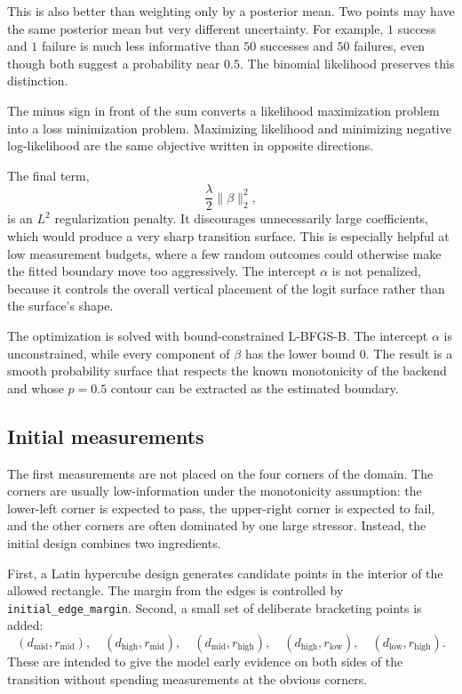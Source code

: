 This is also better than weighting only by a posterior mean.  Two points may
have the same posterior mean but very different uncertainty.  For example,
\(1\) success and \(1\) failure is much less informative than \(50\) successes
and \(50\) failures, even though both suggest a probability near \(0.5\).  The
binomial likelihood preserves this distinction.

The minus sign in front of the sum converts a likelihood maximization problem
into a loss minimization problem.  Maximizing likelihood and minimizing negative
log-likelihood are the same objective written in opposite directions.

The final term,
\[
    \frac{\lambda}{2}\|\beta\|_2^2,
\]
is an \(L^2\) regularization penalty.  It discourages unnecessarily large
coefficients, which would produce a very sharp transition surface.  This is
especially helpful at low measurement budgets, where a few random outcomes
could otherwise make the fitted boundary move too aggressively.  The intercept
\(\alpha\) is not penalized, because it controls the overall vertical placement
of the logit surface rather than the surface's shape.

The optimization is solved with bound-constrained L-BFGS-B.  The intercept
\(\alpha\) is unconstrained, while every component of \(\beta\) has the lower
bound \(0\).  The result is a smooth probability surface that respects the known
monotonicity of the backend and whose \(p=0.5\) contour can be extracted as the
estimated boundary.

\subsection{Initial measurements}

The first measurements are not placed on the four corners of the domain.  The
corners are usually low-information under the monotonicity assumption: the
lower-left corner is expected to pass, the upper-right corner is expected to
fail, and the other corners are often dominated by one large stressor.  Instead,
the initial design combines two ingredients.

First, a Latin hypercube design generates candidate points in the interior of
the allowed rectangle.  The margin from the edges is controlled by
\texttt{initial\_edge\_margin}.  Second, a small set of deliberate bracketing
points is added:
\[
    (d_{\mathrm{mid}}, r_{\mathrm{mid}}), \quad
    (d_{\mathrm{high}}, r_{\mathrm{mid}}), \quad
    (d_{\mathrm{mid}}, r_{\mathrm{high}}), \quad
    (d_{\mathrm{high}}, r_{\mathrm{low}}), \quad
    (d_{\mathrm{low}}, r_{\mathrm{high}}).
\]
These are intended to give the model early evidence on both sides of the
transition without spending measurements at the obvious corners.

